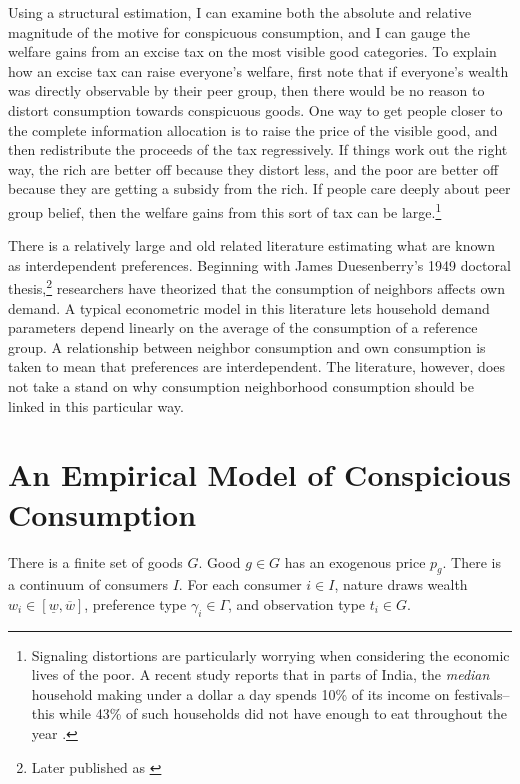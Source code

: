 Using a structural estimation, I can examine both the absolute and relative magnitude of the motive for conspicuous consumption, and I can gauge the welfare gains from an excise tax on the most visible good categories.  To explain how an excise tax can raise everyone's welfare, first note that if everyone's wealth was directly observable by their peer group, then there would be no reason to distort consumption towards conspicuous goods.  One way to get people closer to the complete information allocation is to raise the price of the visible good, and then redistribute the proceeds of the tax regressively.  If things work out the right way, the rich are better off because they distort less, and the poor are better off because they are getting a subsidy from the rich.  If people care deeply about peer group belief, then the welfare gains from this sort of tax can be large.\footnote{Signaling distortions are particularly worrying when considering the economic lives of the poor.  A recent study reports that in parts of India, the \emph{median} household making under a dollar a day spends 10\% of its income on festivals--this while 43\% of such households did not have enough to eat throughout the year \citep{BanerjeeDuflo2007}.  } 

There is a relatively large and old related literature estimating what are known as interdependent preferences.  Beginning with James Duesenberry's 1949 doctoral thesis,\footnote{Later published as \citep{Duesenberry1949}} researchers have theorized that the consumption of neighbors affects own demand.  A typical econometric model in this literature lets household demand parameters depend linearly on the average of the consumption of a reference group. A relationship between neighbor consumption and own consumption is taken to mean that preferences are interdependent.  The literature, however, does not take a stand on why consumption neighborhood consumption should be linked in this particular way.

\section{An Empirical Model of Conspicious Consumption}

There is a finite set of goods $G$.  Good $g \in G$ has an exogenous price $p_g$.  There is a continuum of consumers $I$. For each consumer $i \in I$, nature draws wealth $w_i \in \left[ \underline{w},\overline{w} \right]$, preference type $\gamma_i \in \Gamma$, and observation type $t_i \in G$.

